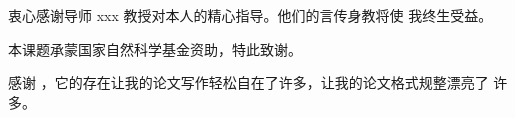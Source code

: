 

\begin{ack}
  衷心感谢导师 xxx 教授对本人的精心指导。他们的言传身教将使
  我终生受益。

  本课题承蒙国家自然科学基金资助，特此致谢。

  感谢 \whutthesis，它的存在让我的论文写作轻松自在了许多，让我的论文格式规整漂亮了
  许多。
\end{ack}
